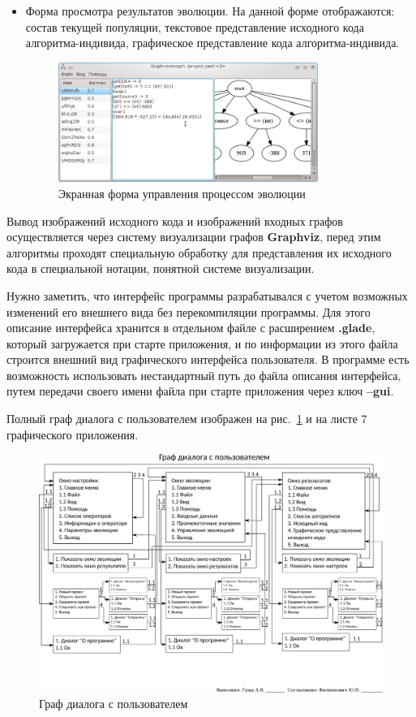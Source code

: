 \documentclass[russian,utf8,emptystyle]{eskdtext}
\begin{document}
\begin{spacing}{1.5}
\begin{itemize}
\item Форма просмотра результатов эволюции. На данной форме отображаются: состав текущей популяции, текстовое представление исходного кода алгоритма-индивида, графическое представление кода алгоритма-индивида.

\begin{figure}[h!]
\centering
\includegraphics[width=0.8\textwidth]{screen19}
\caption{Экранная форма управления процессом эволюции}
\end{figure}

\end{itemize}

Вывод изображений исходного кода и изображений входных графов осуществляется через систему визуализации графов \textbf{Graphviz}, перед этим алгоритмы проходят специальную обработку для представления их исходного кода в специальной нотации, понятной системе визуализации.

Нужно заметить, что интерфейс программы разрабатывался с учетом возможных изменений его внешнего вида без перекомпиляции программы. Для этого описание интерфейса хранится в отдельном файле с расширением \textbf{.glade}, который загружается при старте приложения, и по информации из этого файла строится внешний вид графического интерфейса пользователя. В программе есть возможность использовать нестандартный путь до файла описания интерфейса, путем передачи своего имени файла при старте приложения через ключ \textbf{--gui}. 

Полный граф диалога с пользователем изображен на рис.~\ref{fig:dialogGraph} и на листе 7 графического приложения.

\begin{figure}[h!]
\centering
\includegraphics[width=1.3\textwidth, angle=90]{list7}
\caption{Граф диалога с пользователем}
\label{fig:dialogGraph}
\end{figure}


\end{spacing}
\end{document}
